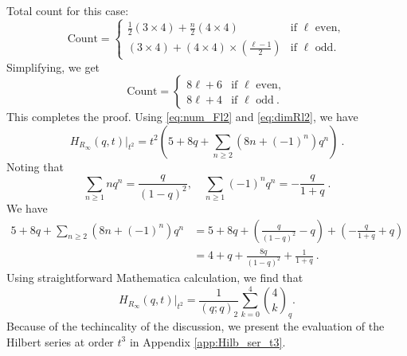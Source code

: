 \documentclass[a4paper,10pt]{article}
\begin{document}
Total count for this case:
\begin{equation}
\text{Count} = 
\begin{cases} 
\frac{1}{2}(3 \times 4) + \frac{n}{2}(4 \times 4) & \text{if } \ell \text{ even}, \\
(3 \times 4) + (4 \times 4) \times \left(\frac{\ell - 1}{2}\right) & \text{if } \ell \text{ odd}.
\end{cases}
\end{equation}
Simplifying, we get
\begin{equation}
\text{Count} = 
\begin{cases} 
8\ell + 6 & \text{if } \ell \text{ even}, \\
8\ell + 4 & \text{if } \ell \text{ odd}~.
\end{cases}
\end{equation}
This completes the proof. 
Using \eqref{eq:num_Fl2} and \eqref{eq:dimRl2}, we have 
\begin{equation}
H_{R_\infty}(q,t)|_{t^2} = t^2\left(5+8 q+\sum_{n \geq 2}\left(8 n+(-1)^n\right) q^n\right)~.
\end{equation}
Noting that
\begin{equation}
\sum_{n \geq 1} n q^n=\frac{q}{(1-q)^2}, \quad \sum_{n \geq 1}(-1)^n q^n=-\frac{q}{1+q}~.
\end{equation}
We have
\begin{equation}\label{eq:I_2-1_calc}
\begin{aligned}
5+8 q+\sum_{n \geq 2}\left(8 n+(-1)^n\right) q^n & =5+8 q+\left(\frac{q}{(1-q)^2}-q\right)+\left(-\frac{q}{1+q}+q\right) \\
& =4+q+\frac{8 q}{(1-q)^2}+\frac{1}{1+q}~.
\end{aligned}
\end{equation}
Using straightforward Mathematica calculation, we find that 
\begin{equation}\label{eq:I_2-2_calc}
H_{R_\infty}(q,t)|_{t^2} = \frac{1}{(q ; q)_2} \sum_{k=0}^4\binom{4}{k}_q.
\end{equation}
Because of the techincality of the discussion, we present the evaluation of the Hilbert series at order $t^3$ in Appendix \ref{app:Hilb_ser_t3}. 
\end{document}
